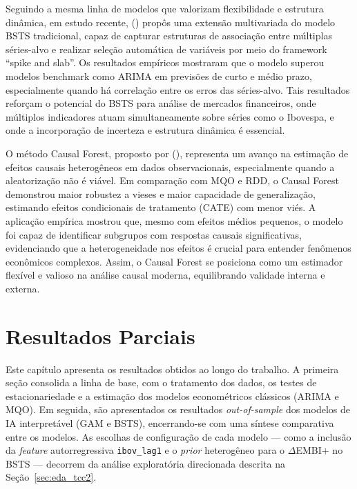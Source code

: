 \documentclass[	12pt, Times, openright, oneside, a4paper, english, brazil]{abntex2}
\begin{document}
 Seguindo a mesma linha de modelos que valorizam flexibilidade e estrutura dinâmica, em estudo recente, \citeauthor{Qiu2020Multivariate} (\citeyear{Qiu2020Multivariate}) propôs uma extensão multivariada do modelo BSTS tradicional, capaz de capturar estruturas de associação entre múltiplas séries-alvo e realizar seleção automática de variáveis por meio do framework “spike and slab”. Os resultados empíricos mostraram que o modelo superou modelos benchmark como ARIMA em previsões de curto e médio prazo, especialmente quando há correlação entre os erros das séries-alvo. Tais resultados reforçam o potencial do BSTS para análise de mercados financeiros, onde múltiplos indicadores atuam simultaneamente sobre séries como o Ibovespa, e onde a incorporação de incerteza e estrutura dinâmica é essencial.

O método Causal Forest, proposto por \citeauthor{Gulen2024Balancing} (\citeyear{Gulen2024Balancing}), representa um avanço na estimação de efeitos causais heterogêneos em dados observacionais, especialmente quando a aleatorização não é viável. Em comparação com MQO e RDD, o Causal Forest demonstrou maior robustez a vieses e maior capacidade de generalização, estimando efeitos condicionais de tratamento (CATE) com menor viés. A aplicação empírica mostrou que, mesmo com efeitos médios pequenos, o modelo foi capaz de identificar subgrupos com respostas causais significativas, evidenciando que a heterogeneidade nos efeitos é crucial para entender fenômenos econômicos complexos. Assim, o Causal Forest se posiciona como um estimador flexível e valioso na análise causal moderna, equilibrando validade interna e externa.


\chapter{Resultados Parciais}

Este capítulo apresenta os resultados obtidos ao longo do trabalho. A primeira seção consolida a linha de base, com o tratamento dos dados, os testes de estacionariedade e a estimação dos modelos econométricos clássicos (ARIMA e MQO). Em seguida, são apresentados os resultados \textit{out-of-sample} dos modelos de IA interpretável (GAM e BSTS), encerrando-se com uma síntese comparativa entre os modelos. As escolhas de configuração de cada modelo — como a inclusão da \textit{feature} autorregressiva \texttt{ibov\_lag1} e o \textit{prior} heterogêneo para o $\Delta$EMBI+ no BSTS — decorrem da análise exploratória direcionada descrita na Seção~\ref{sec:eda_tcc2}.
\end{document}
